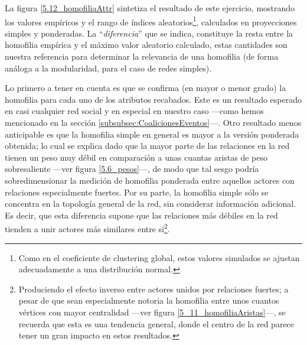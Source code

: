 \documentclass[letterpaper, 11pt]{book}
\theoremstyle{definition}
\theoremstyle{remark}
\begin{document}
La figura \ref{5.12_homofiliaAttr} sintetiza el resultado de este ejercicio, mostrando los valores empíricos y el rango de índices aleatorios\footnote{
    Como en el coeficiente de clustering global, estos valores simulados se ajustan adecuadamente a una distribución normal. 
}, calculados en proyecciones simples y ponderadas. 
La ``\emph{diferencia}'' que se indica, constituye la resta entre la homofilia empírica y el máximo valor aleatorio calculado, estas cantidades son nuestra referencia para determinar la relevancia de una homofilia (de forma análoga a la modularidad, para el caso de redes simples). 


Lo primero a tener en cuenta es que se confirma (en mayor o menor grado) la homofilia para cada uno de los atributos recabados. 
Este es un resultado esperado en casi cualquier red social y en especial en nuestro caso ---como hemos mencionado en la sección \ref{subsubsec:CoalicionesEventos}---. 
Otro resultado menos anticipable es que la homofilia simple en general es mayor a la versión ponderada obtenida; lo cual se explica dado que la mayor parte de las relaciones en la red tienen un peso muy débil en comparación a unas cuantas aristas de peso sobresaliente ---ver figura \ref{5.6_pesos}---, de modo que tal sesgo podría sobredimensionar la medición de homofilia ponderada entre aquellos actores con relaciones especialmente fuertes. 
Por su parte, la homofilia simple sólo se concentra en la topología general de la red, sin considerar información adicional. 
Es decir, que esta diferencia supone que las relaciones más débiles en la red tienden a unir actores más similares entre sí\footnote{
    Produciendo el efecto inverso entre actores unidos por relaciones fuertes; a pesar de que sean especialmente notoria la homofilia entre unos cuantos vértices con mayor centralidad ---ver figura \ref{5_11_homofiliaAristas}---, se recuerda que esta es una tendencia general, donde el centro de la red parece tener un gran impacto en estos resultados. 
}. 
\end{document}
